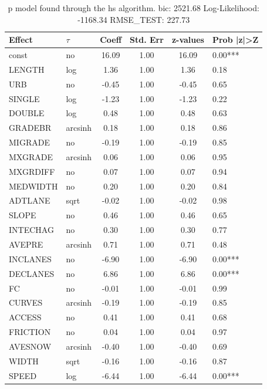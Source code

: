 \begin{table}
	\caption{p model found through the hs algorithm. bic: 2521.68 Log-Likelihood: -1168.34 RMSE_TEST: 227.73}
	\begin{center}
		\begin{tabular}{|l|l|c|c|c|l|}
			\hline
			Effect & $\tau$ & Coeff & Std. Err & z-values & Prob |z|>Z \\
			\hline
			const & no & 16.09 & 1.00 & 16.09 & 0.00*** \\
			\hline
			LENGTH & log & 1.36 & 1.00 & 1.36 & 0.18 \\
			\hline
			URB & no & -0.45 & 1.00 & -0.45 & 0.65 \\
			\hline
			SINGLE & log & -1.23 & 1.00 & -1.23 & 0.22 \\
			\hline
			DOUBLE & log & 0.48 & 1.00 & 0.48 & 0.63 \\
			\hline
			GRADEBR & arcsinh & 0.18 & 1.00 & 0.18 & 0.86 \\
			\hline
			MIGRADE & no & -0.19 & 1.00 & -0.19 & 0.85 \\
			\hline
			MXGRADE & arcsinh & 0.06 & 1.00 & 0.06 & 0.95 \\
			\hline
			MXGRDIFF & no & 0.07 & 1.00 & 0.07 & 0.94 \\
			\hline
			MEDWIDTH & no & 0.20 & 1.00 & 0.20 & 0.84 \\
			\hline
			ADTLANE & sqrt & -0.02 & 1.00 & -0.02 & 0.98 \\
			\hline
			SLOPE & no & 0.46 & 1.00 & 0.46 & 0.65 \\
			\hline
			INTECHAG & no & 0.30 & 1.00 & 0.30 & 0.77 \\
			\hline
			AVEPRE & arcsinh & 0.71 & 1.00 & 0.71 & 0.48 \\
			\hline
			INCLANES & no & -6.90 & 1.00 & -6.90 & 0.00*** \\
			\hline
			DECLANES & no & 6.86 & 1.00 & 6.86 & 0.00*** \\
			\hline
			FC & no & -0.01 & 1.00 & -0.01 & 0.99 \\
			\hline
			CURVES & arcsinh & -0.19 & 1.00 & -0.19 & 0.85 \\
			\hline
			ACCESS & no & 0.41 & 1.00 & 0.41 & 0.68 \\
			\hline
			FRICTION & no & 0.04 & 1.00 & 0.04 & 0.97 \\
			\hline
			AVESNOW & arcsinh & -0.40 & 1.00 & -0.40 & 0.69 \\
			\hline
			WIDTH & sqrt & -0.16 & 1.00 & -0.16 & 0.87 \\
			\hline
			SPEED & log & -6.44 & 1.00 & -6.44 & 0.00*** \\

\end{tabular}
\end{center}
\end{table}

